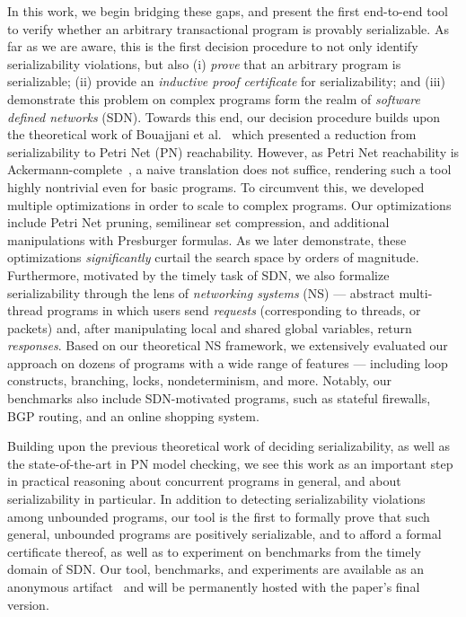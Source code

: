 In this work, we begin bridging these gaps, and present the first end-to-end tool to verify whether an arbitrary transactional program is provably serializable.  
As far as we are aware, this is the first decision procedure to not only identify serializability violations, but also (i) \textit{prove} that an arbitrary program is serializable; (ii) provide an \textit{inductive proof certificate} for serializability; and (iii) demonstrate this problem on complex programs form the realm of \textit{software defined networks} (SDN).
%
Towards this end, our decision procedure builds upon the theoretical work of Bouajjani et al.~\cite{BoEmEnHa13} which presented a reduction from serializability to Petri Net (PN) reachability.  However, as Petri Net reachability is Ackermann-complete~\cite{CzWo22}, a naive translation does not suffice, rendering such a tool highly nontrivial even for basic programs. To circumvent this, we developed multiple optimizations in order to scale to complex programs. 
Our optimizations include Petri Net pruning, semilinear set compression, and additional manipulations with Presburger formulas.
As we later demonstrate, these optimizations \textit{significantly} curtail the search space by orders of magnitude.
%
Furthermore, motivated by the timely task of SDN, 
we also formalize serializability through the lens of \textit{networking systems} (NS) --- abstract multi-thread programs in which users send \textit{requests} (corresponding to threads, or packets) and, after manipulating local and shared global variables, return \textit{responses}.
Based on our theoretical NS framework, we extensively evaluated our approach on dozens of programs with a wide range of features --- including loop constructs, branching, locks, nondeterminism, and more. Notably, our benchmarks also include SDN-motivated programs, such as stateful firewalls, BGP routing, and an online shopping system.


Building upon the previous theoretical work of deciding serializability, as well as the state-of-the-art in PN model checking, we see this work as an important step in practical reasoning about concurrent programs in general, and about serializability in particular.
In addition to detecting serializability violations among unbounded programs, our tool is the first to formally prove that such general, unbounded programs are positively serializable, and to afford a formal certificate thereof, as well as to experiment on benchmarks from the timely domain of SDN.
Our tool, benchmarks, and experiments are available as an anonymous artifact~\cite{ArtifactRepository} and will be permanently hosted with the paper’s final version.

